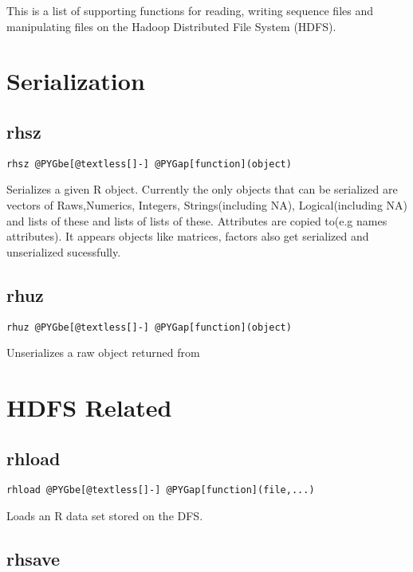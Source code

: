 \documentclass[letterpaper,10pt,english]{manual}
\begin{document}
This is a list of supporting functions for reading, writing sequence files and
manipulating files on the Hadoop Distributed File System (HDFS).


\section{Serialization}


\subsection{rhsz}

\begin{Verbatim}[commandchars=@\[\]]
rhsz @PYGbe[@textless[]-] @PYGap[function](object)
\end{Verbatim}

Serializes a given R object. Currently the only objects that can be serialized
are vectors of Raws,Numerics, Integers, Strings(including NA), Logical(including NA)
and lists of these and lists of lists of these. Attributes are copied to(e.g
names attributes). It appears objects like matrices, factors also get serialized
and unserialized sucessfully.


\subsection{rhuz}

\begin{Verbatim}[commandchars=@\[\]]
rhuz @PYGbe[@textless[]-] @PYGap[function](object)
\end{Verbatim}

Unserializes a raw object returned from 


\section{HDFS Related}


\subsection{rhload}

\begin{Verbatim}[commandchars=@\[\]]
rhload @PYGbe[@textless[]-] @PYGap[function](file,...)
\end{Verbatim}

Loads an R data set stored on the DFS.


\subsection{rhsave}
\end{document}
